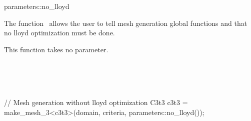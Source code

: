 \ccRefPageBegin


\begin{ccRefFunction}{parameters::no_lloyd}  %


\ccDefinition
  
The function \ccRefName\ allows the user to tell mesh generation global functions
 and  that no lloyd optimization must be done.



\ccParameters

This function takes no parameter.

\ccSeeAlso

 \\
 \\
 \\


\ccExample

\begin{ccExampleCode}
// Mesh generation without lloyd optimization
C3t3 c3t3 = make_mesh_3<c3t3>(domain, criteria, parameters::no_lloyd());
\end{ccExampleCode}


\end{ccRefFunction}

\ccRefPageEnd

